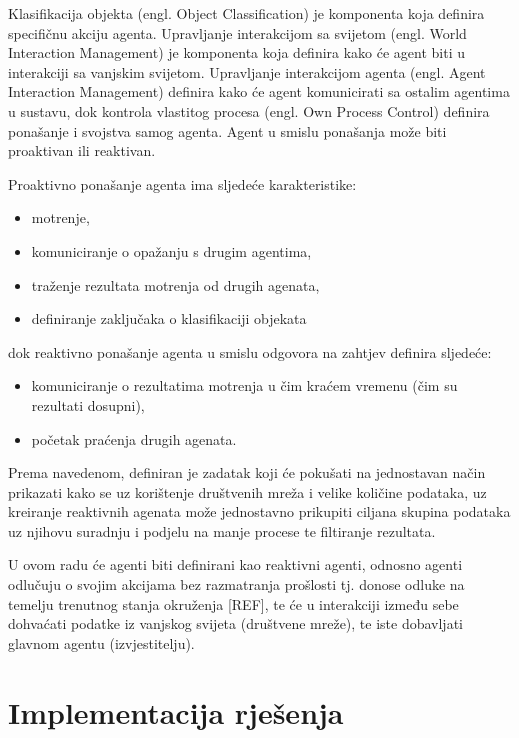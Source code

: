 \documentclass[a4paper,12pt]{foi}
\begin{document}
Klasifikacija objekta (engl. Object Classification) je komponenta koja definira specifičnu akciju agenta. Upravljanje interakcijom sa svijetom (engl. World Interaction Management) je komponenta koja definira kako će agent biti u interakciji sa vanjskim svijetom. Upravljanje interakcijom agenta (engl. Agent Interaction Management) definira kako će agent komunicirati sa ostalim agentima u sustavu, dok kontrola vlastitog procesa (engl. Own Process Control) definira ponašanje i svojstva samog agenta. Agent u smislu ponašanja može biti proaktivan ili reaktivan.

Proaktivno ponašanje agenta ima sljedeće karakteristike:

\begin{itemize}
\item{motrenje,}
\item{komuniciranje o opažanju s drugim agentima,}
\item{traženje rezultata motrenja od drugih agenata,}
\item{definiranje zaključaka o klasifikaciji objekata}
\end{itemize}

dok reaktivno ponašanje agenta u smislu odgovora na zahtjev definira sljedeće:

\begin{itemize}
\item{komuniciranje o rezultatima motrenja u čim kraćem vremenu (čim su rezultati dosupni),}
\item{početak praćenja drugih agenata.}
\end{itemize}

Prema navedenom, definiran je zadatak koji će pokušati na jednostavan način prikazati kako se uz korištenje društvenih mreža i velike količine podataka, uz kreiranje reaktivnih agenata može jednostavno prikupiti ciljana skupina podataka uz njihovu suradnju i podjelu na manje procese te filtiranje rezultata.

U ovom radu će agenti biti definirani kao reaktivni agenti, odnosno agenti odlučuju o svojim akcijama bez razmatranja prošlosti tj. donose odluke na temelju trenutnog stanja okruženja [REF], te će u interakciji između sebe dohvaćati podatke iz vanjskog svijeta (društvene mreže), te iste dobavljati glavnom agentu (izvjestitelju).


\chapter{Implementacija rješenja}
\end{document}
